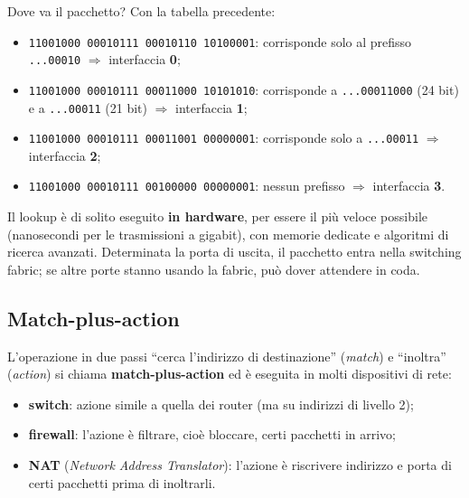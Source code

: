 \begin{esempio}{Dove va il pacchetto?}
Con la tabella precedente:
\begin{itemize}
    \item \texttt{11001000 00010111 00010110 10100001}: corrisponde solo al prefisso \texttt{...00010} $\Rightarrow$ interfaccia \textbf{0};
    \item \texttt{11001000 00010111 00011000 10101010}: corrisponde a \texttt{...00011000} (24 bit) e a \texttt{...00011} (21 bit)
          $\Rightarrow$ interfaccia \textbf{1};
    \item \texttt{11001000 00010111 00011001 00000001}: corrisponde solo a \texttt{...00011} $\Rightarrow$ interfaccia \textbf{2};
    \item \texttt{11001000 00010111 00100000 00000001}: nessun prefisso $\Rightarrow$ interfaccia \textbf{3}.
\end{itemize}
\end{esempio}


Il lookup è di solito eseguito \textbf{in hardware}, per essere il più veloce possibile (nanosecondi per le
trasmissioni a gigabit), con memorie dedicate e algoritmi di ricerca avanzati. Determinata la porta di uscita, il
pacchetto entra nella switching fabric; se altre porte stanno usando la fabric, può dover attendere in coda.

\subsection{Match-plus-action}

L'operazione in due passi ``cerca l'indirizzo di destinazione'' (\emph{match}) e ``inoltra'' (\emph{action}) si
chiama \textbf{match-plus-action} ed è eseguita in molti dispositivi di rete:

\begin{itemize}
    \item \textbf{switch}: azione simile a quella dei router (ma su indirizzi di livello 2);
    \item \textbf{firewall}: l'azione è filtrare, cioè bloccare, certi pacchetti in arrivo;
    \item \textbf{NAT} (\emph{Network Address Translator}): l'azione è riscrivere indirizzo e porta di certi pacchetti prima di inoltrarli.
\end{itemize}

